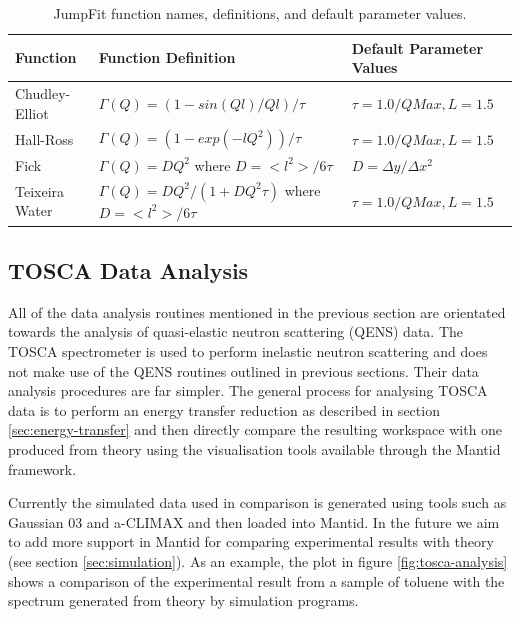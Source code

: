 \documentclass[paper=a4, fontsize=11pt]{scrartcl}	%
\numberwithin{equation}{section}															%
\numberwithin{figure}{section}																%
\numberwithin{table}{section}																%
\begin{document}
\begin{table}[H]
\begin{center}
\begin{tabular}{ l l l}
Function & Function Definition & Default Parameter Values \\ \hline
Chudley-Elliot &  $\Gamma(Q) = (1 - sin(Ql)/Ql)/\tau$ & $\tau = 1.0/QMax, L=1.5$\\ \hline
Hall-Ross & $\Gamma(Q) = (1-exp(-lQ^2))/\tau$ & $\tau = 1.0/QMax, L=1.5$ \\ \hline
Fick & \parbox{6cm}{$\Gamma(Q) = DQ^2$ \\ where $D=<l^2>/6\tau$} & $D = \Delta y / \Delta x^2$\\ \hline
Teixeira Water & \parbox{6cm}{$\Gamma(Q) = DQ^2/(1 + DQ^2\tau)$ \\ where $D=<l^2>/6\tau$} & $\tau = 1.0/QMax, L=1.5$ \\ \hline
\end{tabular}
\caption{JumpFit function names, definitions, and default parameter values.}
\label{table:jumpfit-functions}
\end{center}
\end{table}

\subsection{TOSCA Data Analysis}
All of the data analysis routines mentioned in the previous section are orientated towards the analysis of quasi-elastic neutron scattering (QENS) data. The TOSCA spectrometer is used to perform inelastic neutron scattering and does not make use of the QENS routines outlined in previous sections. Their data analysis procedures are far simpler. The general process for analysing TOSCA data is to perform an energy transfer reduction as described in section \ref{sec:energy-transfer} and then directly compare the resulting workspace with one produced from theory using the visualisation tools available through the Mantid framework. 

Currently the simulated data used in comparison is generated using tools such as Gaussian 03 and a-CLIMAX and then loaded into Mantid. In the future we aim to add more support in Mantid for comparing experimental results with theory (see section \ref{sec:simulation}). As an example, the plot in figure \ref{fig:tosca-analysis} shows a comparison of the experimental result from a sample of toluene with the spectrum generated from theory by simulation programs.
\end{document}
